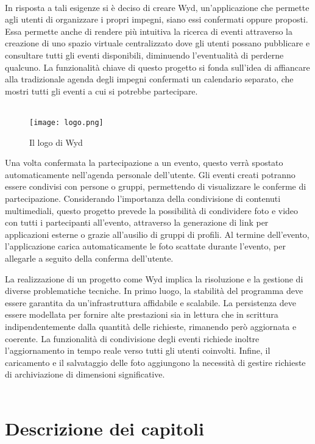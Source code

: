 \\
In risposta a tali esigenze si è deciso di creare Wyd, 
un'applicazione che permette agli utenti di organizzare i propri impegni, 
siano essi confermati oppure proposti. 
Essa permette anche di rendere più intuitiva la ricerca di eventi 
attraverso la creazione di uno spazio virtuale centralizzato 
dove gli utenti possano pubblicare e consultare tutti gli eventi disponibili,
diminuendo l’eventualità di perderne qualcuno.
La funzionalità chiave di questo progetto si fonda sull'idea di affiancare
alla tradizionale agenda degli impegni confermati un calendario separato, 
che mostri tutti gli eventi a cui si potrebbe partecipare. \\
\\
\begin{wrapfigure}{r}{0.4\textwidth}
    \centering
    \texttt{[image: logo.png]}
    \caption{Il logo di Wyd}
\end{wrapfigure}	
Una volta confermata la partecipazione a un evento, 
questo verrà spostato automaticamente nell'agenda personale dell'utente.
Gli eventi creati potranno essere condivisi con persone o gruppi, 
permettendo di visualizzare le conferme di partecipazione. 
Considerando l'importanza della condivisione di contenuti multimediali, 
questo progetto prevede la possibilità di condividere foto e video con tutti i partecipanti all'evento, 
attraverso la generazione di link per applicazioni esterne o grazie all'ausilio di gruppi di profili. 
Al termine dell'evento, l'applicazione carica automaticamente le foto scattate durante l'evento,
per allegarle a seguito della conferma dell'utente.



\clearpage
La realizzazione di un progetto come Wyd implica
la risoluzione e la gestione di diverse problematiche tecniche. 
In primo luogo, la stabilità del programma deve essere garantita 
da un'infrastruttura affidabile e scalabile. 
La persistenza deve essere modellata per fornire alte prestazioni sia in lettura che in scrittura 
indipendentemente dalla quantità delle richieste,
rimanendo però aggiornata e coerente.
La funzionalità di condivisione degli eventi richiede inoltre l'aggiornamento in tempo reale verso tutti gli utenti coinvolti.
Infine, il caricamento e il salvataggio delle foto aggiungono la necessità di gestire richieste di archiviazione di dimensioni significative.\\
\\
\section*{Descrizione dei capitoli}

